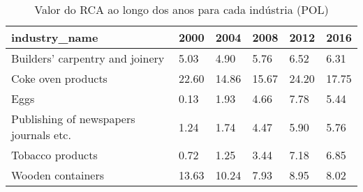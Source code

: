 \begin{table}
\centering
\caption{Valor do RCA ao longo dos anos para cada indústria (POL)}
\begin{tabular}{p{6cm}p{1.5cm}p{1.5cm}p{1.5cm}p{1.5cm}p{1.5cm}}
\toprule
                         industry\_name &  2000 &  2004 &  2008 &  2012 &  2016 \\
\midrule
       Builders' carpentry and joinery &  5.03 &  4.90 &  5.76 &  6.52 &  6.31 \\
                    Coke oven products & 22.60 & 14.86 & 15.67 & 24.20 & 17.75 \\
                                  Eggs &  0.13 &  1.93 &  4.66 &  7.78 &  5.44 \\
Publishing of newspapers journals etc. &  1.24 &  1.74 &  4.47 &  5.90 &  5.76 \\
                      Tobacco products &  0.72 &  1.25 &  3.44 &  7.18 &  6.85 \\
                     Wooden containers & 13.63 & 10.24 &  7.93 &  8.95 &  8.02 \\
\bottomrule
\end{tabular}
\end{table}
